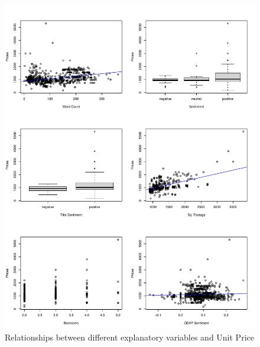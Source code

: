 \documentclass[12pt,english]{article}
\begin{document}
\begin{figure}[ht]
\centering
\bigskip{}
\includegraphics[width=.9\linewidth]{craigslist.plots.pdf}
\caption{Relationships between different explanatory variables and Unit Price}
\label{fig:fig2}
\end{figure}

\clearpage
\end{document}

